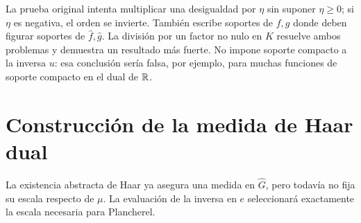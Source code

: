 La prueba original intenta multiplicar una desigualdad por $\eta$ sin suponer $\eta\ge0$; si $\eta$ es negativa, el orden se invierte. También escribe soportes de $f,g$ donde deben figurar soportes de $\widehat f,\widehat g$. La división por un factor no nulo en $K$ resuelve ambos problemas y demuestra un resultado más fuerte. No impone soporte compacto a la inversa $u$: esa conclusión sería falsa, por ejemplo, para muchas funciones de soporte compacto en el dual de $\mathbb R$.

\section{Construcción de la medida de Haar dual}
La existencia abstracta de Haar ya asegura una medida en $\widehat G$, pero todavía no fija su escala respecto de $\mu$. La evaluación de la inversa en $e$ seleccionará exactamente la escala necesaria para Plancherel.

